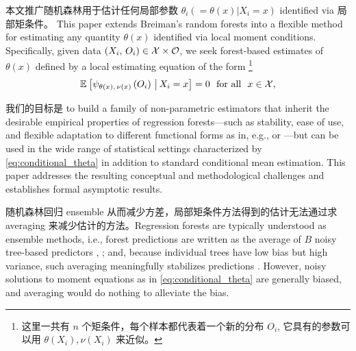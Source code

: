 \documentclass[aos]{imsart}
\theoremstyle{plain}
\theoremstyle{definition}
\theoremstyle{remark}
\begin{document}
\begin{CJK}{UTF8}{gbsn}
本文推广随机森林用于估计任何局部参数 $\theta_i(= \theta(x)|X_i=x)$ identified via 局部矩条件。 This paper extends Breiman's random forests into a flexible
method for estimating any quantity $\theta(x)$ identified via local moment conditions. Specifically,
given data $(X_i, \, O_i) \in \mathcal{X} \times \mathcal{O}$, we seek forest-based estimates of $\theta(x)$ defined by a local
estimating equation of the form \footnote{这里一共有 $n$ 个矩条件，每个样本都代表着一个新的分布 $O_i$, 它具有的参数可以用 $\theta(X_i), \nu(X_i)$ 来近似。}
\begin{equation}
\label{eq:conditional_theta}
\EE{\psi_{\theta(x), \, \nu(x)}\p{O_i} \cond X_i = x} = 0 \ \text{ for all } \ x \in \xx, 
\end{equation}

我们的目标是 to build a family of non-parametric
estimators that inherit the desirable empirical properties of regression forests---such as
stability, ease of use, and flexible adaptation to different functional forms as in, e.g.,
\citet{biau2016random} or \citet{varian2014big}---but can be
used in the wide range of statistical settings characterized by \eqref{eq:conditional_theta}
in addition to standard conditional mean estimation.
This paper addresses the resulting conceptual and methodological challenges
and establishes formal asymptotic results.

随机森林回归 ensemble 从而减少方差，局部矩条件方法得到的估计无法通过求 averaging 来减少估计的方法。Regression forests are typically understood as ensemble methods, i.e., forest
predictions  are written as the average of $B$ noisy tree-based predictors ,
;
and, because individual trees  have low bias but high variance,
such averaging meaningfully stabilizes predictions \citep{buhlmann2002analyzing,scornet2015consistency}.
However, noisy solutions to moment
equations as in \eqref{eq:conditional_theta} are generally biased, and averaging
would do nothing to alleviate the bias.


\end{CJK}
\end{document}
